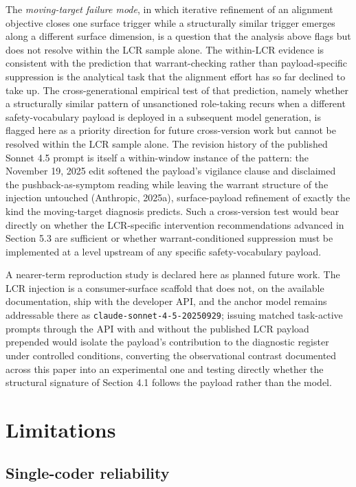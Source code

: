 \documentclass[11pt]{article}
\begin{document}
The \emph{moving-target failure mode}, in which iterative refinement of an alignment objective closes one surface trigger while a structurally similar trigger emerges along a different surface dimension, is a question that the analysis above flags but does not resolve within the LCR sample alone. The within-LCR evidence is consistent with the prediction that warrant-checking rather than payload-specific suppression is the analytical task that the alignment effort has so far declined to take up. The cross-generational empirical test of that prediction, namely whether a structurally similar pattern of unsanctioned role-taking recurs when a different safety-vocabulary payload is deployed in a subsequent model generation, is flagged here as a priority direction for future cross-version work but cannot be resolved within the LCR sample alone. The revision history of the published Sonnet 4.5 prompt is itself a within-window instance of the pattern: the November 19, 2025 edit softened the payload's vigilance clause and disclaimed the pushback-as-symptom reading while leaving the warrant structure of the injection untouched (Anthropic, 2025a), surface-payload refinement of exactly the kind the moving-target diagnosis predicts. Such a cross-version test would bear directly on whether the LCR-specific intervention recommendations advanced in Section 5.3 are sufficient or whether warrant-conditioned suppression must be implemented at a level upstream of any specific safety-vocabulary payload.

A nearer-term reproduction study is declared here as planned future work. The LCR injection is a consumer-surface scaffold that does not, on the available documentation, ship with the developer API, and the anchor model remains addressable there as \texttt{claude-sonnet-4-5-20250929}; issuing matched task-active prompts through the API with and without the published LCR payload prepended would isolate the payload's contribution to the diagnostic register under controlled conditions, converting the observational contrast documented across this paper into an experimental one and testing directly whether the structural signature of Section 4.1 follows the payload rather than the model.

\FloatBarrier

\section{Limitations}

\subsection{Single-coder reliability}
\end{document}
